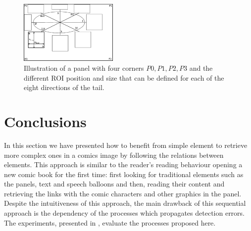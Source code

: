 

 \begin{figure}[!ht]
   \centering
  \includegraphics[width=180px]{roi_hypothesis.pdf}
  \caption[Illustration of the character region of interested computation for each of the eight directions of the tail]{Illustration of a panel with four corners $P0, P1, P2, P3$ and the different ROI position and size that can be defined for each of the eight directions of the tail.
  }
  \label{fig:se:roi_area}
 \end{figure}




\section{Conclusions}
\label{sec:se:conclusion}
In this section we have presented how to benefit from simple element to retrieve more complex ones in a comics image by following the relations between elements.
This approach is similar to the reader's reading behaviour opening a new comic book for the first time: first looking for traditional elements such as the panels, text and speech balloons and then, reading their content and retrieving the links with the comic characters and other graphics in the panel.
Despite the intuitiveness of this approach, the main drawback of this sequential approach is the dependency of the processes which propagates detection errors.
The experiments, presented in , evaluate the processes proposed here.

